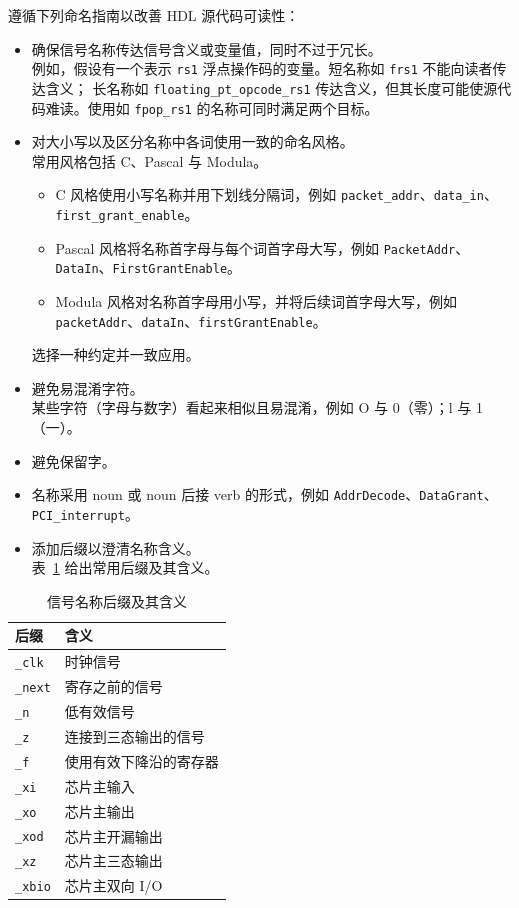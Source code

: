 遵循下列命名指南以改善 HDL 源代码可读性：
\begin{itemize}
  \item 确保信号名称传达信号含义或变量值，同时不过于冗长。\\
        例如，假设有一个表示 \texttt{rs1} 浮点操作码的变量。短名称如 \texttt{frs1} 不能向读者传达含义；
        长名称如 \texttt{floating\_pt\_opcode\_rs1} 传达含义，但其长度可能使源代码难读。使用如 \texttt{fpop\_rs1} 的名称可同时满足两个目标。
  \item 对大小写以及区分名称中各词使用一致的命名风格。\\
        常用风格包括 C、Pascal 与 Modula。
  \begin{itemize}
    \item C 风格使用小写名称并用下划线分隔词，例如 \texttt{packet\_addr}、\texttt{data\_in}、\texttt{first\_grant\_enable}。
    \item Pascal 风格将名称首字母与每个词首字母大写，例如 \texttt{PacketAddr}、\texttt{DataIn}、\texttt{FirstGrantEnable}。
    \item Modula 风格对名称首字母用小写，并将后续词首字母大写，例如 \texttt{packetAddr}、\texttt{dataIn}、\texttt{firstGrantEnable}。
  \end{itemize}
        选择一种约定并一致应用。
  \item 避免易混淆字符。\\
        某些字符（字母与数字）看起来相似且易混淆，例如 O 与 0（零）；l 与 1（一）。
  \item 避免保留字。
  \item 名称采用 noun 或 noun 后接 verb 的形式，例如 \texttt{AddrDecode}、\texttt{DataGrant}、\texttt{PCI\_interrupt}。
  \item 添加后缀以澄清名称含义。\\
        表~\ref{tab:suffix} 给出常用后缀及其含义。
\end{itemize}

\begin{table}[htbp]
\centering
\caption{信号名称后缀及其含义}
\label{tab:suffix}
\begin{tabularx}{\textwidth}{@{}l X@{}}
\toprule
\textbf{后缀} & \textbf{含义} \\
\midrule
\texttt{\_clk} & 时钟信号 \\
\texttt{\_next} & 寄存之前的信号 \\
\texttt{\_n} & 低有效信号 \\
\texttt{\_z} & 连接到三态输出的信号 \\
\texttt{\_f} & 使用有效下降沿的寄存器 \\
\texttt{\_xi} & 芯片主输入 \\
\texttt{\_xo} & 芯片主输出 \\
\texttt{\_xod} & 芯片主开漏输出 \\
\texttt{\_xz} & 芯片主三态输出 \\
\texttt{\_xbio} & 芯片主双向 I/O \\
\bottomrule
\end{tabularx}
\end{table}

